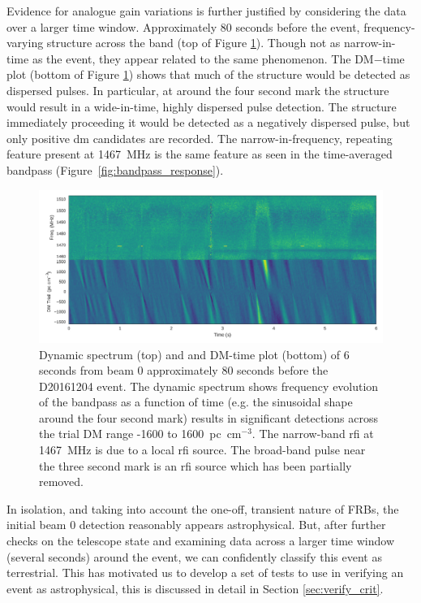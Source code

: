 \documentclass[a4paper,fleqn,usenatbib]{mnras}
\begin{document}
Evidence for analogue gain variations is further justified by considering the
data over a larger time window.  Approximately 80 seconds before the event,
frequency-varying structure across the band (top of Figure \ref{fig:beam0_80s}).
Though not as narrow-in-time as the event, they appear related to the same
phenomenon.  The DM$-$time plot (bottom of Figure \ref{fig:beam0_80s}) shows
that much of the structure would be detected as dispersed pulses.  In
particular, at around the four second mark the structure would result in a
wide-in-time, highly dispersed pulse detection.  The structure immediately
proceeding it would be detected as a negatively dispersed pulse, but only
positive \gls{dm} candidates are recorded.  The narrow-in-frequency, repeating
feature present at 1467~MHz is the same feature as seen in the time-averaged
bandpass (Figure~\ref{fig:bandpass_response}).

\begin{figure}
    \includegraphics[width=1.0\linewidth]{figures/D20161204_spect_and_dm_buf21_Beam0.pdf}
    \caption{
    Dynamic spectrum (top) and and DM-time plot (bottom) of 6 seconds from beam
    0 approximately 80 seconds before the D20161204 event.  The dynamic spectrum
    shows frequency evolution of the bandpass as a function of time (e.g. the
    sinusoidal shape around the four second mark) results in significant
    detections across the trial DM range -1600 to 1600~pc~cm$^{-3}$. The
    narrow-band \gls{rfi} at 1467~MHz is due to a local \gls{rfi} source. The
    broad-band pulse near the three second mark is an \gls{rfi} source which has
    been partially removed.
    }
    \label{fig:beam0_80s}
\end{figure}

In isolation, and taking into account the one-off, transient nature of FRBs, the
initial beam 0 detection reasonably appears astrophysical. But, after further
checks on the telescope state and examining data across a larger time window
(several seconds) around the event, we can confidently classify this event as
terrestrial. This has motivated us to develop a set of tests to use in verifying
an event as astrophysical, this is discussed in detail in Section
\ref{sec:verify_crit}.
\end{document}
